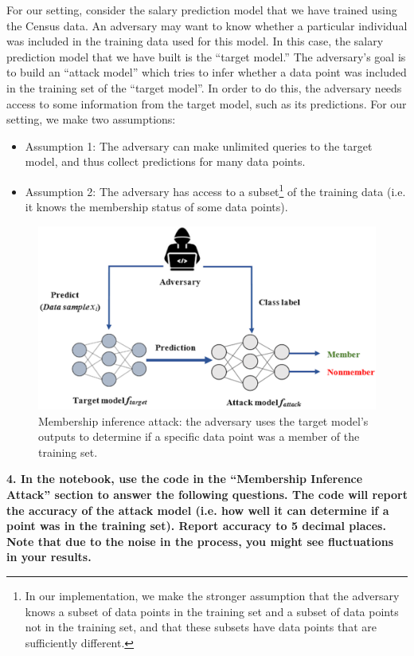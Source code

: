 \documentclass{article}
\begin{document}
For our setting, consider the salary prediction model that we have trained using the Census data. An adversary may want to know whether a particular individual was included in the training data used for this model. In this case, the salary prediction model that we have built is the ``target model.'' The adversary's goal is to build an ``attack model'' which tries to infer whether a data point was included in the training set of the ``target model''. In order to do this, the adversary needs access to some information from the target model, such as its predictions. For our setting, we make two assumptions:
\begin{itemize}
    \item Assumption 1: The adversary can make unlimited queries to the target model, and thus collect predictions for many data points. 
    \item Assumption 2: The adversary has access to a subset\footnote{In our implementation, we make the stronger assumption that the adversary knows a subset of data points in the training set and a subset of data points not in the training set, and that these subsets have data points that are sufficiently different.} of the training data (i.e. it knows the membership status of some data points).
\end{itemize}

\begin{figure}[h!]
\centering
\includegraphics[width=0.5\columnwidth]{MIA.png}
\caption{Membership inference attack: the adversary uses the target model's outputs to determine if a specific data point was a member of the training set.}
\label{fig:MIA}
\end{figure}


\textbf{4. In the notebook, use the code in the ``Membership Inference Attack'' section to answer the following questions. The code will report the accuracy of the attack model (i.e. how well it can determine if a point was in the training set). Report accuracy to 5 decimal places. Note that due to the noise in the process, you might see fluctuations in your results. }
\end{document}
